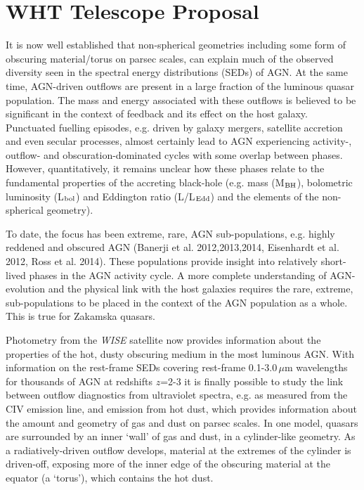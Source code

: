 \section{WHT Telescope Proposal}

It is now well established that non-spherical geometries
including some form of obscuring material/torus on parsec scales, can
explain much of the observed diversity seen in the
spectral energy distributions (SEDs) of AGN. At the same time,
AGN-driven outflows are present in a large fraction of the luminous
quasar population.  The mass and energy associated with these outflows
is believed to be significant in the context of feedback and its
effect on the host galaxy. Punctuated fuelling episodes, e.g. driven
by galaxy mergers, satellite accretion and even secular processes,
almost certainly lead to AGN experiencing activity-, outflow- and
obscuration-dominated cycles with some overlap between phases.
However, quantitatively, it remains unclear how these phases relate to
the fundamental properties of the accreting black-hole (e.g.  mass
(M$_{\rm{BH}}$), bolometric luminosity (L$_{\rm{bol}}$) and Eddington
ratio (L/L$_{\rm{Edd}}$) and the elements of the non-spherical geometry).

\vspace{1.5mm}

To date, the focus has been extreme, rare, AGN sub-populations,
e.g. highly reddened and obscured AGN (Banerji et al. 2012,2013,2014,
Eisenhardt et al. 2012, Ross et al. 2014). These populations provide
insight into relatively short-lived phases in the AGN activity
cycle. A more complete understanding of AGN-evolution and the physical
link with the host galaxies requires the rare, extreme,
sub-populations to be placed in the context of the AGN population as a
whole. This is true for Zakamska quasars. 

Photometry from the \textit{WISE} satellite now provides
information about the properties of the hot, dusty obscuring medium in
the most luminous AGN.  With information on the rest-frame SEDs
covering rest-frame 0.1-3.0\,$\mu$m wavelengths for thousands of AGN
at redshifts $z$=2-3 it is finally possible to study the link between
outflow diagnostics from ultraviolet spectra, e.g. as measured from
the CIV emission line, and emission from hot dust, which provides
information about the amount and geometry of gas and dust on parsec
scales. In one model, quasars are surrounded by an
inner `wall' of gas and dust, in a cylinder-like geometry. As a
radiatively-driven outflow develops, material at the extremes of the
cylinder is driven-off, exposing more of the inner edge of the
obscuring material at the equator (a `torus'), which contains the hot
dust. 

